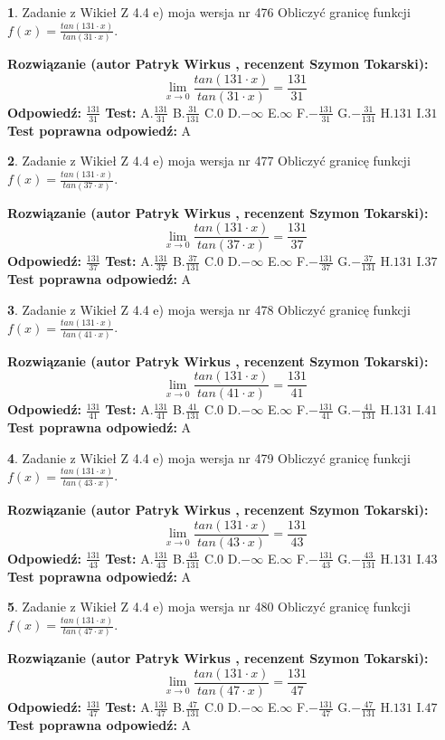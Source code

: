 \documentclass[12pt, a4paper]{article}
\theoremstyle{definition} %
\newtheorem{zad}{}
\newcommand{\zadStart}[1]{\begin{zad}#1\newline}
\newcommand{\zadStop}{\end{zad}}
\newcommand{\rozwStart}[2]{\noindent \textbf{Rozwiązanie (autor #1 , recenzent #2): }\newline}
\newcommand{\rozwStop}{\newline}
\newcommand{\odpStart}{\noindent \textbf{Odpowiedź:}\newline}
\newcommand{\odpStop}{\newline}
\newcommand{\testStart}{\noindent \textbf{Test:}\newline}
\newcommand{\testStop}{\newline}
\newcommand{\kluczStart}{\noindent \textbf{Test poprawna odpowiedź:}\newline}
\newcommand{\kluczStop}{\newline}
\begin{document}
\zadStart{Zadanie z Wikieł Z 4.4 e) moja wersja nr 476}
Obliczyć granicę funkcji $f(x)=\frac{tan(131\cdot x)}{tan(31\cdot x)}$.
\zadStop
\rozwStart{Patryk Wirkus}{Szymon Tokarski}
$$\lim\limits_{x\to 0}\frac{tan(131\cdot x)}{tan(31\cdot x)}=
\frac{131}{31}$$
\rozwStop
\odpStart
$\frac{131}{31}$
\odpStop
\testStart
A.$\frac{131}{31}$
B.$\frac{31}{131}$
C.$0$
D.$-\infty$
E.$\infty$
F.$-\frac{131}{31}$
G.$-\frac{31}{131}$
H.$131$
I.$31$
\testStop
\kluczStart
A
\kluczStop



\zadStart{Zadanie z Wikieł Z 4.4 e) moja wersja nr 477}
Obliczyć granicę funkcji $f(x)=\frac{tan(131\cdot x)}{tan(37\cdot x)}$.
\zadStop
\rozwStart{Patryk Wirkus}{Szymon Tokarski}
$$\lim\limits_{x\to 0}\frac{tan(131\cdot x)}{tan(37\cdot x)}=
\frac{131}{37}$$
\rozwStop
\odpStart
$\frac{131}{37}$
\odpStop
\testStart
A.$\frac{131}{37}$
B.$\frac{37}{131}$
C.$0$
D.$-\infty$
E.$\infty$
F.$-\frac{131}{37}$
G.$-\frac{37}{131}$
H.$131$
I.$37$
\testStop
\kluczStart
A
\kluczStop



\zadStart{Zadanie z Wikieł Z 4.4 e) moja wersja nr 478}
Obliczyć granicę funkcji $f(x)=\frac{tan(131\cdot x)}{tan(41\cdot x)}$.
\zadStop
\rozwStart{Patryk Wirkus}{Szymon Tokarski}
$$\lim\limits_{x\to 0}\frac{tan(131\cdot x)}{tan(41\cdot x)}=
\frac{131}{41}$$
\rozwStop
\odpStart
$\frac{131}{41}$
\odpStop
\testStart
A.$\frac{131}{41}$
B.$\frac{41}{131}$
C.$0$
D.$-\infty$
E.$\infty$
F.$-\frac{131}{41}$
G.$-\frac{41}{131}$
H.$131$
I.$41$
\testStop
\kluczStart
A
\kluczStop



\zadStart{Zadanie z Wikieł Z 4.4 e) moja wersja nr 479}
Obliczyć granicę funkcji $f(x)=\frac{tan(131\cdot x)}{tan(43\cdot x)}$.
\zadStop
\rozwStart{Patryk Wirkus}{Szymon Tokarski}
$$\lim\limits_{x\to 0}\frac{tan(131\cdot x)}{tan(43\cdot x)}=
\frac{131}{43}$$
\rozwStop
\odpStart
$\frac{131}{43}$
\odpStop
\testStart
A.$\frac{131}{43}$
B.$\frac{43}{131}$
C.$0$
D.$-\infty$
E.$\infty$
F.$-\frac{131}{43}$
G.$-\frac{43}{131}$
H.$131$
I.$43$
\testStop
\kluczStart
A
\kluczStop



\zadStart{Zadanie z Wikieł Z 4.4 e) moja wersja nr 480}
Obliczyć granicę funkcji $f(x)=\frac{tan(131\cdot x)}{tan(47\cdot x)}$.
\zadStop
\rozwStart{Patryk Wirkus}{Szymon Tokarski}
$$\lim\limits_{x\to 0}\frac{tan(131\cdot x)}{tan(47\cdot x)}=
\frac{131}{47}$$
\rozwStop
\odpStart
$\frac{131}{47}$
\odpStop
\testStart
A.$\frac{131}{47}$
B.$\frac{47}{131}$
C.$0$
D.$-\infty$
E.$\infty$
F.$-\frac{131}{47}$
G.$-\frac{47}{131}$
H.$131$
I.$47$
\testStop
\kluczStart
A
\kluczStop
\end{document}
